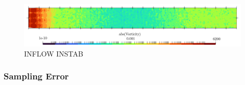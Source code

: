 \begin{figure}[t]
\centering
\includegraphics[scale=0.36]{assets/graphs/u-inflow-instab.png}
\caption{INFLOW INSTAB}
\label{fig:inflow-instab}
\end{figure}


\subsubsection{Sampling Error}


